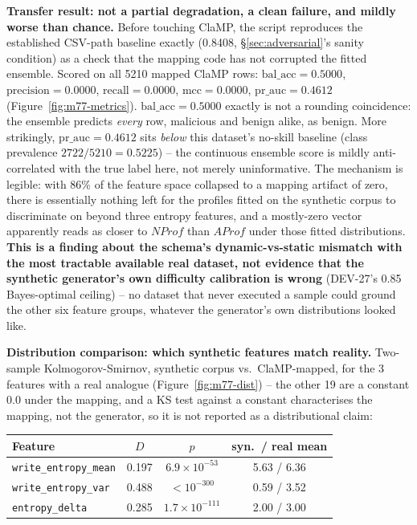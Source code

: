 \documentclass[conference]{IEEEtran}
\begin{document}
\textbf{Transfer result: not a partial degradation, a clean failure, and mildly worse than
chance.} Before touching ClaMP, the script reproduces the established CSV-path baseline exactly
(0.8408, \S\ref{sec:adversarial}'s sanity condition) as a check that the mapping code has not
corrupted the fitted ensemble. Scored on all 5210 mapped ClaMP rows:
$\mathrm{bal\_acc}=0.5000$, $\mathrm{precision}=0.0000$, $\mathrm{recall}=0.0000$,
$\mathrm{mcc}=0.0000$, $\mathrm{pr\_auc}=0.4612$ (Figure~\ref{fig:m77-metrics}).
$\mathrm{bal\_acc}=0.5000$ exactly is not a rounding coincidence: the ensemble predicts
\emph{every} row, malicious and benign alike, as benign. More strikingly, $\mathrm{pr\_auc}=0.4612$
sits \emph{below} this dataset's no-skill baseline (class prevalence $2722/5210=0.5225$) -- the
continuous ensemble score is mildly anti-correlated with the true label here, not merely
uninformative. The mechanism is legible: with 86\% of the feature space collapsed to a mapping
artifact of zero, there is essentially nothing left for the profiles fitted on the synthetic
corpus to discriminate on beyond three entropy features, and a mostly-zero vector apparently reads
as closer to $NProf$ than $AProf$ under those fitted distributions. \textbf{This is a finding
about the schema's dynamic-vs-static mismatch with the most tractable available real dataset, not
evidence that the synthetic generator's own difficulty calibration is wrong} (DEV-27's 0.85
Bayes-optimal ceiling) -- no dataset that never executed a sample could ground the other six
feature groups, whatever the generator's own distributions looked like.

\textbf{Distribution comparison: which synthetic features match reality.} Two-sample
Kolmogorov-Smirnov, synthetic corpus vs.\ ClaMP-mapped, for the 3 features with a real analogue
(Figure~\ref{fig:m77-dist}) -- the other 19 are a constant $0.0$ under the mapping, and a KS test
against a constant characterises the mapping, not the generator, so it is not reported as a
distributional claim:

\begin{center}
\scriptsize
\begin{tabular}{lccc}
\hline
\textbf{Feature} & \textbf{$D$} & \textbf{$p$} & \textbf{syn.\ / real mean} \\
\hline
\texttt{write\_entropy\_mean} & 0.197 & $6.9\times10^{-53}$ & 5.63 / 6.36 \\
\texttt{write\_entropy\_var} & 0.488 & $<10^{-300}$ & 0.59 / 3.52 \\
\texttt{entropy\_delta} & 0.285 & $1.7\times10^{-111}$ & 2.00 / 3.00 \\
\hline
\end{tabular}
\end{center}
\end{document}
